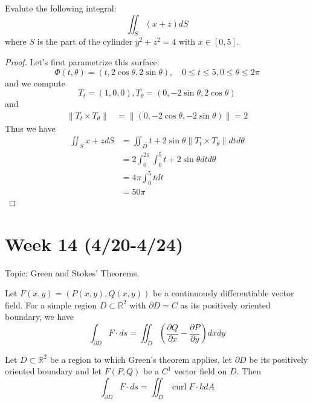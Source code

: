 \documentclass[openany]{book}
\newcommand{\R}{\mathbb{R}}
\newcommand{\curl}{\operatorname{curl}}
\begin{document}
\begin{prob}
    Evalute the following integral:
    \begin{equation*}
        \iint_S(x+z)dS
    \end{equation*}
    where $S$ is the part of the cylinder $y^2+z^2=4$ with $x\in [0,5]$.
\end{prob}
\begin{proof}
    Let's first parametrize this surface:
    \begin{equation*}
        \Phi(t,\theta)=(t, 2\cos\theta, 2\sin\theta), \quad 0\leq t\leq 5, 0\leq\theta\leq 2\pi
    \end{equation*}
    and we compute 
    \begin{equation*}
        T_t=(1, 0, 0), T_\theta=(0, -2\sin\theta, 2\cos\theta)
    \end{equation*}
    and 
    \begin{align*}
        \|T_t\times T_\theta\|&=\|(0, -2\cos\theta, -2\sin\theta)\|=2
    \end{align*}
    Thus we have 
    \begin{align*}
        \iint_Sx+zdS&=\iint_Dt+2\sin\theta\|T_t\times T_\theta\|dtd\theta\\
        &=2\int_0^{2\pi}\int_0^5t+2\sin\theta dtd\theta\\
        &=4\pi\int_0^5tdt\\
        &=50\pi
    \end{align*}
\end{proof}



\newpage
\section*{\centering Week 14 (4/20-4/24)}
Topic: Green and Stokes' Theorems.


\begin{thm}
    Let $F(x,y)=(P(x,y), Q(x,y))$ be a continuously differentiable vector field. For a simple region $D\subset\R^2$ with $\partial D=C$ as its positively oriented boundary, we have 
    \begin{equation*}
        \int_{\partial D}F\cdot ds=\iint_D\left(\frac{\partial Q}{\partial x}-\frac{\partial P}{\partial y}\right)dxdy
    \end{equation*}
\end{thm}


\begin{thm}
    Let $D\subset\R^2$ be a region to which Green's theorem applies, let $\partial D$ be its positively oriented boundary and let $F(P,Q)$ be a $C^1$ vector field on $D$. Then 
    \begin{equation*}
        \int_{\partial D}F\cdot ds=\iint_D\curl F\cdot k dA
    \end{equation*}
\end{thm}
\end{document}
